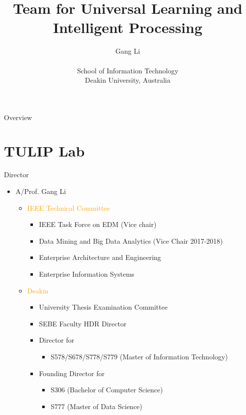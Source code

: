 \documentclass[
 size=14pt,
 paper=smartboard,  %
 mode=present, 		%
 display=slides, 	%
 style=tuliplab,  	%
 pauseslide,
 fleqn,leqno]{powerdot}
\title{Team for Universal Learning and Intelligent Processing}
\author{
Gang Li
\\
\\School of Information Technology
\\Deakin University, Australia
}
\date{\gitCommitterDate}
\begin{document}
\maketitle



\begin{slide}[toc=,bm=]{Overview}
\tableofcontents[content=currentsection,type=1]
\end{slide}


\section{TULIP Lab}
\begin{slide}{Director}
    \begin{itemize}
      \item A/Prof. Gang Li
      \begin{itemize}
        \item \textcolor{orange}{IEEE Technical Committee}
         \begin{itemize}
           \item IEEE Task Force on EDM (Vice chair)
           \item Data Mining and Big Data Analytics (Vice Chair 2017-2018)
           \item Enterprise Architecture and Engineering
           \item Enterprise Information Systems
         \end{itemize}
        \item \textcolor{orange}{Deakin}
          \begin{itemize}
            \item University Thesis Examination Committee
            \item SEBE Faculty HDR Director
            \item Director for
                \begin{itemize}
                  \item S578/S678/S778/S779 (Master of Information Technology)
                \end{itemize}
            \item Founding Director for
                \begin{itemize}
                  \item S306 (Bachelor of Computer Science)
                  \item S777 (Master of Data Science)
                \end{itemize}
          \end{itemize}
      \end{itemize}
    \end{itemize}
\end{slide}
\end{document}

